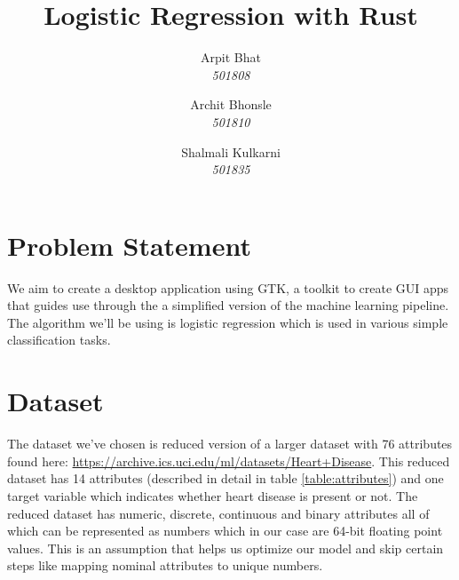 \documentclass[12pt, a4]{article}
\title{
  \vspace{-1.0cm}
  \textbf{Logistic Regression with Rust}
}
\author{
  Arpit Bhat\\
  \textit{501808}
  \and
  Archit Bhonsle\\
  \textit{501810}
  \and
  Shalmali Kulkarni\\
  \textit{501835}
}
\date{}
\begin{document}
\maketitle
\thispagestyle{fancy}

\section{Problem Statement}

We aim to create a desktop application using GTK, a toolkit to create GUI apps
that guides use through the a simplified version of the machine learning pipeline. The algorithm we'll be using is logistic regression which is used in
various simple classification tasks.

\section{Dataset}

The dataset we've chosen is reduced version of a larger dataset with 76
attributes found here:
\url{https://archive.ics.uci.edu/ml/datasets/Heart+Disease}.
This reduced dataset has 14 attributes (described in detail in table
\ref{table:attributes}) and one target variable which indicates whether heart
disease is present or not. The reduced dataset has numeric, discrete,
continuous and binary attributes all of which can be represented as numbers
which in our case are 64-bit floating point values. This is an assumption that helps us optimize our model and skip certain steps like mapping nominal attributes to unique numbers.
\end{document}
